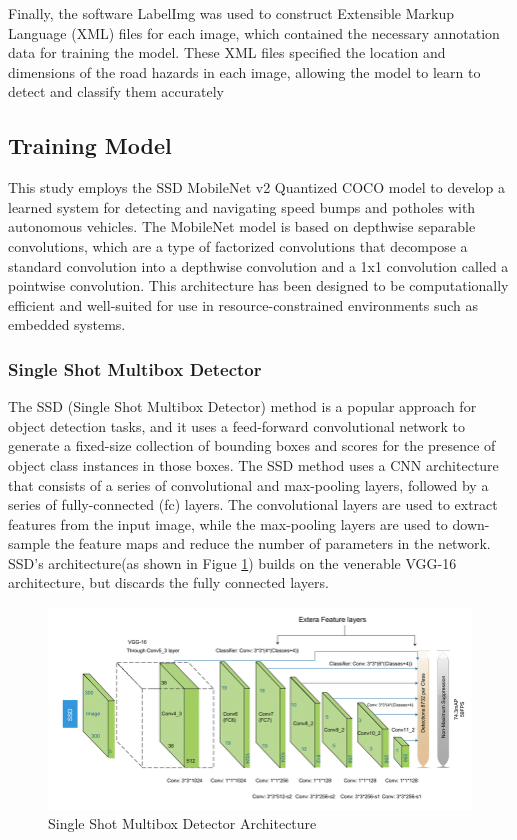 \noindent
Finally, the software LabelImg was used to construct Extensible Markup Language (XML) files for each image, which contained the necessary annotation data for training the model. These XML files specified the location and dimensions of the road hazards in each image, allowing the model to learn to detect and classify them accurately

\subsection{Training Model}
This study employs the SSD MobileNet v2 Quantized COCO model to develop a learned system for detecting and navigating speed bumps and potholes with autonomous vehicles. The MobileNet model is based on depthwise separable convolutions, which are a type of factorized convolutions that decompose a standard convolution into a depthwise convolution and a 1x1 convolution called a pointwise convolution. This architecture has been designed to be computationally efficient and well-suited for use in resource-constrained environments such as embedded systems.
\subsubsection{Single Shot Multibox Detector}
\noindent
The SSD (Single Shot Multibox Detector) method is a popular approach for object detection tasks, and it uses a feed-forward convolutional network to generate a fixed-size collection of bounding boxes and scores for the presence of object class instances in those boxes. The SSD method uses a CNN architecture that consists of a series of convolutional and max-pooling layers, followed by a series of fully-connected (fc) layers. The convolutional layers are used to extract features from the input image, while the max-pooling layers are used to down-sample the feature maps and reduce the number of parameters in the network. SSD’s architecture(as shown in Figue \ref{fig:ssd_img}) builds on the venerable VGG-16 architecture, but discards the fully connected layers. 
\begin{figure}[h]
    \centering
    \includegraphics[scale=0.7]{Figures/chapter3/ssd_architecture.png}
    \caption{Single Shot Multibox Detector Architecture}
    \label{fig:ssd_img}
\end{figure}

